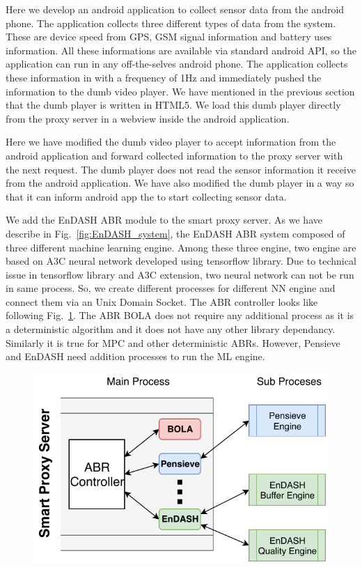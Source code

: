 Here we develop an android application to collect sensor data from the android phone. The application collects three different types of data from the system. These are device speed from GPS, GSM signal information and battery uses information. All these informations are available via standard android API, so the application can run in any off-the-selves android phone. The application collects these information in with a frequency of 1Hz and immediately pushed the information to the dumb video player. We have mentioned in the previous section that the dumb player is written in HTML5. We load this dumb player directly from the proxy server in a webview inside the android application.

Here we have modified the dumb video player to accept information from the android application and forward collected information to the proxy server with the next request. The dumb player does not read the sensor information it receive from the android application. We have also modified the dumb player in a way so that it can inform android app the to start collecting sensor data.

We add the EnDASH ABR module to the smart proxy server. As we have describe in Fig.~\ref{fig:EnDASH_system},  the EnDASH ABR system composed of three different machine learning engine. Among these three engine, two engine are based on A3C neural network developed using tensorflow library. Due to technical issue in tensorflow library and A3C extension, two neural network can not be run in same process. So, we create different processes for different NN engine and connect them via an Unix Domain Socket. The ABR controller looks like following Fig.~\ref{fig:AbrServer}. The ABR BOLA does not require any additional process as it is a deterministic algorithm and it does not have any other library dependancy. Similarly it is true for MPC and other deterministic ABRs. However, Pensieve and EnDASH need addition processes to run the ML engine.

\begin{figure}[h!]
	\begin{center}
		\includegraphics[width=0.7\linewidth]{img/AbrServer}
	\end{center}
	\caption{\label{fig:AbrServer}}
\end{figure}

